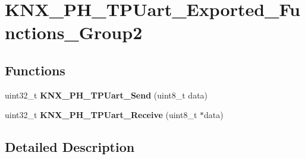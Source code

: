 \hypertarget{group___k_n_x___p_h___t_p_uart___exported___functions___group2}{}\section{K\+N\+X\+\_\+\+P\+H\+\_\+\+T\+P\+Uart\+\_\+\+Exported\+\_\+\+Functions\+\_\+\+Group2}
\label{group___k_n_x___p_h___t_p_uart___exported___functions___group2}
\subsection*{Functions}
\begin{DoxyCompactItemize}
\item 
uint32\+\_\+t {\bfseries K\+N\+X\+\_\+\+P\+H\+\_\+\+T\+P\+Uart\+\_\+\+Send} (uint8\+\_\+t data)\hypertarget{group___k_n_x___p_h___t_p_uart___exported___functions___group2_ga81caae82b83fd5d8384df4ce7284ca73}{}\label{group___k_n_x___p_h___t_p_uart___exported___functions___group2_ga81caae82b83fd5d8384df4ce7284ca73}

\item 
uint32\+\_\+t {\bfseries K\+N\+X\+\_\+\+P\+H\+\_\+\+T\+P\+Uart\+\_\+\+Receive} (uint8\+\_\+t $\ast$data)\hypertarget{group___k_n_x___p_h___t_p_uart___exported___functions___group2_gaed5fc58a2bd18234f214c895c02b0a02}{}\label{group___k_n_x___p_h___t_p_uart___exported___functions___group2_gaed5fc58a2bd18234f214c895c02b0a02}

\end{DoxyCompactItemize}


\subsection{Detailed Description}
